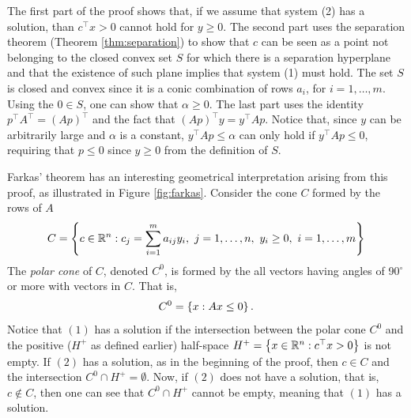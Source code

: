 The first part of the proof shows that, if we assume that system (2) has a solution, than $c^\top x > 0$ cannot hold for $y \geq 0$. The second part uses the separation theorem (Theorem \ref{thm:separation}) to show that $c$ can be seen as a point not belonging to the closed convex set $S$ for which there is a separation hyperplane and that the existence of such plane implies that system (1) must hold. The set $S$ is closed and convex since it is a conic combination of rows $a_i$, for $i=1, \dots, m$. Using the $0 \in S$, one can show that $\alpha \geq 0$. The last part uses the identity $p^\top A^\top  = (Ap)^\top$ and the fact that $(Ap)^\top y = y^\top Ap$. Notice that, since $y$ can be arbitrarily large and $\alpha$ is a constant, $y^\top Ap \leq \alpha$ can only hold if $y^\top Ap \leq 0$, requiring that $p \leq 0$ since $y \geq 0$ from the definition of $S$.

Farkas' theorem has an interesting geometrical interpretation arising from this proof, as illustrated in Figure \ref{fig:farkas}. Consider the cone $C$ formed by the rows of $A$
%
\begin{align*} 
	C = \left\{ c \in \mathbb{R}^n : c_j = \sum_{i=1}^m a_{ij} y_i, \ j= 1,\dots,n, \  y_i \geq 0, \ i =1,\dots, m \right \}
\end{align*}
%
The \emph{polar cone} of $C$, denoted $C^0$, is formed by the all vectors having angles of 90$^\circ$ or more with vectors in $C$. That is, 
%
\begin{align*}
	C^0 = \left\{ x : Ax \leq 0 \right \}.
\end{align*}
%
Notice that $(1)$ has a solution if the intersection between the polar cone $C^0$ and the positive ($H^+$ as defined earlier) half-space $H^+ = \left\{ x \in \mathbb{R}^n: c^\top x > 0 \right \}$ is not empty. If $(2)$ has a solution, as in the beginning of the proof, then $c \in C$ and the intersection $C^0 \cap H^+ = \emptyset$. Now, if $(2)$ does not have a solution, that is, $c \notin C$, then one can see that $C^0 \cap H^+$ cannot be empty, meaning that $(1)$ has a solution.  

